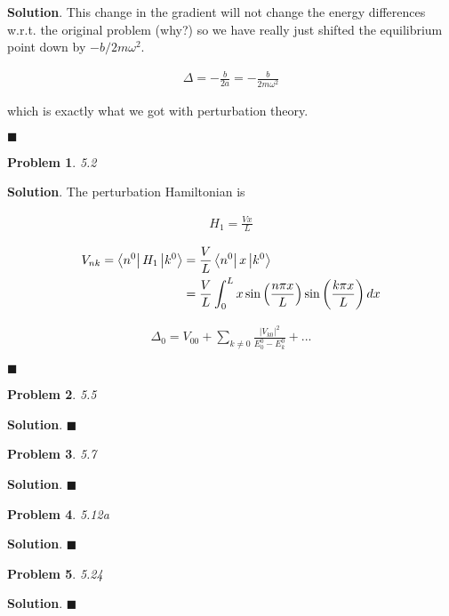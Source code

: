 \documentclass[12pt]{article}
\newtheorem{p}{Problem}
\theoremstyle{definition}
\newenvironment{s}{%
        \begin{trivlist} \item \textbf{Solution}. }{%
            \hspace*{\fill} $\blacksquare$\end{trivlist}}%
\begin{document}
{\begin{s}
This change in the gradient will not change the energy differences w.r.t. the original problem (why?) so we have really just shifted the equilibrium point down by $-b/2m\omega^{2}$.

\begin{align*}
\Delta = -\frac{b}{2a} = -\frac{b}{2m\omega^{2}}
\end{align*}

which is exactly what we got with perturbation theory.


\end{s}

\begin{p}
5.2
\end{p}

\begin{s}
The perturbation Hamiltonian is 

\begin{align*}
H_{1} = \frac{Vx}{L}
\end{align*}

\begin{align*}
V_{nk} = \bra{n^{0}}H_{1}\ket{k^{0}} &= \frac{V}{L}\bra{n^{0}}x\ket{k^{0}} \\
&= \frac{V}{L}\int_{0}^{L} x \sin\left(\frac{n\pi x}{L}\right)\sin\left(\frac{k\pi x}{L}\right)dx
\end{align*}


\begin{align*}
\Delta_{0} = V_{00} + \sum_{k\neq 0}\frac{|V_{k0}|^{2}}{E_{0}^{0}-E_{k}^{0}} + ...
\end{align*}



\end{s}

\begin{p}
5.5
\end{p}

\begin{s}
\end{s}

\begin{p}
5.7
\end{p}

\begin{s}
\end{s}

\begin{p}
5.12a
\end{p}

\begin{s}
\end{s}

\begin{p}
5.24
\end{p}

\begin{s}
\end{s}
\end{document}
